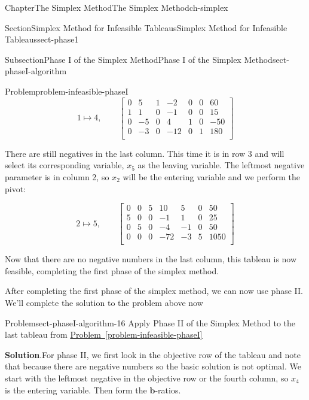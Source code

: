 \documentclass[oneside,10pt,]{book}
\newcommand{\blocktitlefont}{\relax}
\newcommand{\xreffont}{\relax}
\numberwithin{equation}{section}
\newcommand{\amp}{&}
\begin{document}
\begin{chapterptx}{Chapter}{The Simplex Method}{}{The Simplex Method}{}{}{ch-simplex}
\begin{sectionptx}{Section}{Simplex Method for Infeasible Tableaus}{}{Simplex Method for Infeasible Tableaus}{}{}{sect-phase1}
\begin{subsectionptx}{Subsection}{Phase I of the Simplex Method}{}{Phase I of the Simplex Method}{}{}{sect-phaseI-algorithm}
\begin{problem}{Problem}{}{problem-infeasible-phaseI}
%
\begin{equation}
1 \mapsto 4, \qquad \left[\begin{array}{rr|rrrr|r} 0 \amp 5 \amp 1 \amp -2 \amp 0 \amp 0 \amp 60\\ 1 \amp 1 \amp 0 \amp -1 \amp 0 \amp 0 \amp 15\\ 0 \amp -5 \amp 0 \amp 4 \amp 1 \amp 0 \amp -50\\ \hline 0 \amp -3 \amp 0 \amp -12 \amp 0 \amp 1 \amp 180\\ \end{array} \right]\label{eq-phaseI-lop1}
\end{equation}
%
\par
There are still negatives in the last column. This time it is in row 3 and will select its corresponding variable, \(x_5\) as the leaving variable. The leftmost negative parameter is in column 2, so \(x_2\) will be the entering variable and we perform the pivot:%
\par
%
\begin{equation}
2 \mapsto 5, \qquad \left[\begin{array}{rr|rrrr|r} 0 \amp 0 \amp 5 \amp 10 \amp 5 \amp 0 \amp 50\\ 5 \amp 0 \amp 0 \amp -1 \amp 1 \amp 0 \amp 25\\ 0 \amp 5 \amp 0 \amp -4 \amp -1 \amp 0 \amp 50\\ \hline 0 \amp 0 \amp 0 \amp -72 \amp -3 \amp 5 \amp 1050\\ \end{array} \right]\label{eq-phaseI-lop2}
\end{equation}
%
\par
Now that there are no negative numbers in the last column, this tableau is now feasible, completing the first phase of the simplex method.%
\end{problem}
After completing the first phase of the simplex method, we can now use phase II. We'll complete the solution to the problem above now%
\begin{problem}{Problem}{}{sect-phaseI-algorithm-16}%
Apply Phase II of the Simplex Method to the last tableau from \hyperref[problem-infeasible-phaseI]{Problem~{\xreffont\ref{problem-infeasible-phaseI}}}%
\par\smallskip%
\noindent\textbf{\blocktitlefont Solution}.\hypertarget{sect-phaseI-algorithm-16-2}{}\quad{}For phase II, we first look in the objective row of the tableau and note that because there are negative numbers so the basic solution is not optimal. We start with the leftmost negative in the objective row or the fourth column, so \(x_4\) is the entering variable. Then form the \(\boldsymbol{b}\)-ratios.%

\end{problem}
\end{subsectionptx}
\end{sectionptx}
\end{chapterptx}
\end{document}
